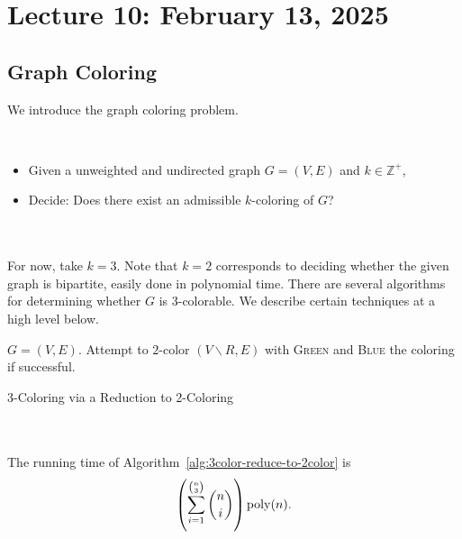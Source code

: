 \section{Lecture 10: February 13, 2025}

    \subsection{Graph Coloring}

        We introduce the graph coloring problem.
        \begin{compprob} \label{prob:graphcolor}
            \vphantom
            \\
            \begin{itemize}
                \item Given a unweighted and undirected graph \(G=(V,E)\) and \(k\in\mathbb{Z}^+\),
                \item Decide: Does there exist an admissible \(k\)-coloring of \(G\)?
            \end{itemize}
        \end{compprob}
        \vphantom
        \\
        \\
        For now, take \(k=3\). Note that \(k=2\) corresponds to deciding whether the given graph is bipartite, easily done in polynomial time. There are several algorithms for determining whether \(G\) is \(3\)-colorable. We describe certain techniques at a high level below.
        \begin{algorithm}[H] 
            \begin{algorithmic}[1]
                \Require \(G=(V,E)\).
                        \State Attempt to \(2\)-color \((V\backslash R,E)\) with \textsc{Green} and \textsc{Blue}
                        \State \Return the coloring if successful.
                    \EndFor
                \EndProcedure 
            \end{algorithmic}
            \caption{3-Coloring via a Reduction to 2-Coloring}
            \label{alg:3color-reduce-to-2color}
        \end{algorithm}
        \vphantom
        \\
        \\
        The running time of Algorithm~\ref{alg:3color-reduce-to-2color} is 
        \begin{equation*}
            \left(\sum_{i=1}^{\binom{n}{3}} \binom{n}{i}\right)\operatorname{poly}(n).
        \end{equation*}
